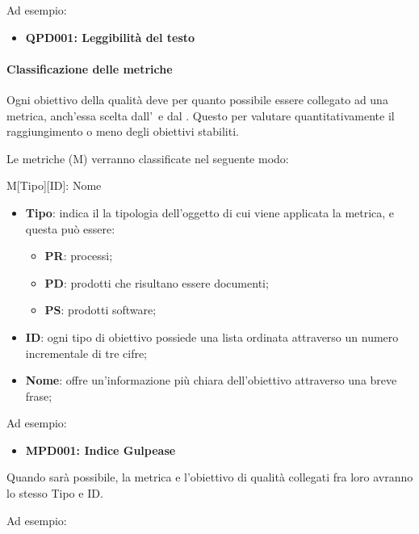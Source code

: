 			Ad esempio:
			
			\begin{itemize}
				\item \textbf{QPD001: Leggibilità del testo}
			\end{itemize}
			
			
			\paragraph{Classificazione delle metriche}
			Ogni obiettivo della qualità deve per quanto possibile essere collegato ad una metrica, anch'essa scelta dall'\Amm~e dal \Ver. Questo per valutare quantitativamente il raggiungimento o meno degli obiettivi stabiliti.
			
			Le metriche (M) verranno classificate nel seguente modo:
			
			\begin{center}
				M[Tipo][ID]: Nome
			\end{center}
			
			\begin{itemize}
				\item \textbf{Tipo}: indica il la tipologia dell'oggetto di cui viene applicata la metrica, e questa può essere:
				\begin{itemize}
					\item \textbf{PR}: processi;
					\item \textbf{PD}: prodotti che risultano essere documenti;
					\item \textbf{PS}: prodotti software;
				\end{itemize}
				
				\item \textbf{ID}: ogni tipo di obiettivo possiede una lista ordinata attraverso un numero incrementale di tre cifre;
				\item \textbf{Nome}: offre un'informazione più chiara dell'obiettivo attraverso una breve frase;
			\end{itemize}
		
			Ad esempio:
			
			\begin{itemize}
				\item \textbf{MPD001: Indice Gulpease}
			\end{itemize}
		
			Quando sarà possibile, la metrica e l'obiettivo di qualità collegati fra loro avranno lo stesso Tipo e ID.
			
			Ad esempio:
		
